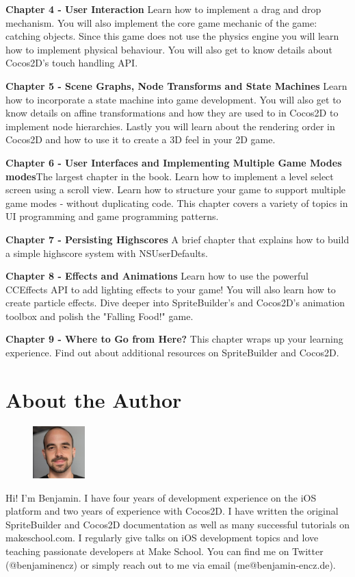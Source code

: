 \textbf{Chapter 4 - User Interaction}\newline
Learn how to implement a drag and drop mechanism. You will also implement the core game mechanic of the game: catching objects. 
Since this game does not use the physics engine you will learn how to implement
physical behaviour. You will also get to know details about Cocos2D's touch
handling API.
\newpage{}

\textbf{Chapter 5 - Scene Graphs, Node Transforms and State Machines}\newline
Learn how to incorporate a state machine into game development. 
You will also get to know details on affine transformations and how they are used to in Cocos2D to implement node hierarchies.
Lastly you will learn about the rendering order in Cocos2D and how to use it to
create a 3D feel in your 2D game.


\textbf{Chapter 6 - User Interfaces and Implementing Multiple Game Modes
modes}\newline The largest chapter in the book. Learn how to implement a level
select screen using a scroll view. Learn how to structure your game to support multiple game modes - without duplicating code. 
This chapter covers a variety of topics in UI programming and game programming patterns.


\textbf{Chapter 7 - Persisting Highscores}\newline
A brief chapter that explains how to build a simple highscore system with
NSUserDefaults.


\textbf{Chapter 8 - Effects and Animations}\newline
Learn how to use the powerful CCEffects API to add lighting effects to your
game! You will also learn how to create particle effects. Dive deeper into
SpriteBuilder's and Cocos2D's animation toolbox and polish the "Falling Food!" game.


\textbf{Chapter 9 - Where to Go from Here?}\newline
This chapter wraps up your learning experience. Find out about additional resources on SpriteBuilder and Cocos2D.
\newpage{}

\section{About the Author}
\begin{figure}
    \includegraphics[width=0.18\textwidth]{images/Chapter1/benji.png}
\end{figure}
Hi! I'm Benjamin. I have four years of development experience on the iOS platform and two years of experience with Cocos2D.
I have written the original SpriteBuilder and Cocos2D documentation as well as
many successful tutorials on makeschool.com. I regularly give talks on iOS
development topics and love teaching passionate developers at Make School. 
You can find me on Twitter (@benjaminencz) or simply reach out to me via email
(me@benjamin-encz.de).

